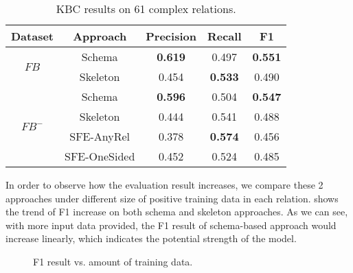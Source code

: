 \begin{table}[ht]
	\small
	\centering
	\caption{KBC results on 61 complex relations.}
	\begin{tabular}{|c||c|c|c|c|}
		\hline
		Dataset					& Approach	& Precision & Recall & F1 \\
        \hline
		\multirow{2}{*}{$FB$}	& Schema	& \textbf{0.619} & 0.497 & \textbf{0.551} \\
		\cline{2-5}
        						& Skeleton	& 0.454 & \textbf{0.533} & 0.490 \\
		\hline
		\multirow{4}{*}{$FB^-$} & Schema		& \textbf{0.596} & 0.504 & \textbf{0.547} \\
		\cline{2-5}
								& Skeleton		& 0.444	& 0.541	& 0.488	\\
		\cline{2-5}
								& SFE-AnyRel	& 0.378	& \textbf{0.574} & 0.456	\\
		\cline{2-5}
								& SFE-OneSided	& 0.452	& 0.524	& 0.485	\\
		\hline
	\end{tabular}
	\label{tab:kbc-complex}
\end{table}


In order to observe how the evaluation result increases,
we compare these 2 approaches under different size of positive training data in each relation.
 shows the trend of F1 increase on both schema and skeleton approaches.
As we can see, with more input data provided, the F1 result of schema-based approach would increase linearly,
which indicates the potential strength of the model.

\begin{figure}[th]
\centering
\caption{F1 result vs. amount of training data.}
\label{fig:trend}
\end{figure}


